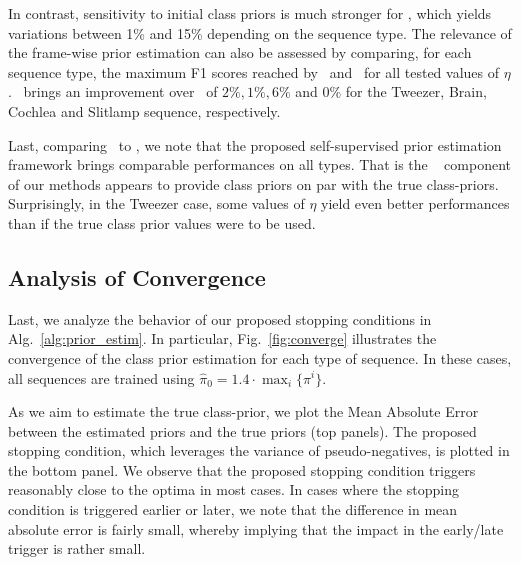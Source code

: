 In contrast, sensitivity to initial class priors is much stronger for \SSnnPUConst, which yields variations between 1\% and 15\% depending on the sequence type. The relevance of the frame-wise prior estimation can also be assessed by comparing, for each sequence type, the maximum F1 scores reached by \SSnnPUKSP~and \SSnnPUConst~for all tested values of $\eta$. \SSnnPUKSP~brings an improvement over \SSnnPUConst~of $2\%, 1\%, 6\%$ and $0\%$ for the Tweezer, Brain, Cochlea and Slitlamp sequence, respectively.

Last, comparing \SSnnPUKSP~to \SSnnPUTrue, we note that the proposed self-supervised prior estimation framework brings comparable performances on all types. That is the \SSnnPU~ component of our methods appears to provide class priors on par with the true class-priors. Surprisingly, in the Tweezer case, some values of $\eta$ yield even better performances than if the true class prior values were to be used.


\subsection{Analysis of Convergence}
\label{sec:convergence}

Last, we analyze the behavior of our proposed stopping conditions in Alg.~\ref{alg:prior_estim}. In particular, Fig.~\ref{fig:converge} illustrates the convergence of the class prior estimation for each type of sequence. In these cases, all sequences are trained using $\hat\pi_{0}= 1.4 \cdot \max_i \{\pi^i\}$.

As we aim to estimate the true class-prior, we plot the Mean Absolute Error between the estimated priors and the true priors (top panels).
The proposed stopping condition, which leverages the variance of pseudo-negatives, is plotted in the bottom panel. We observe that the proposed stopping condition triggers reasonably close to the optima in most cases. In cases where the stopping condition is triggered earlier or later, we note that the difference in mean absolute error is fairly small, whereby implying that the impact in the early/late trigger is rather small. 

